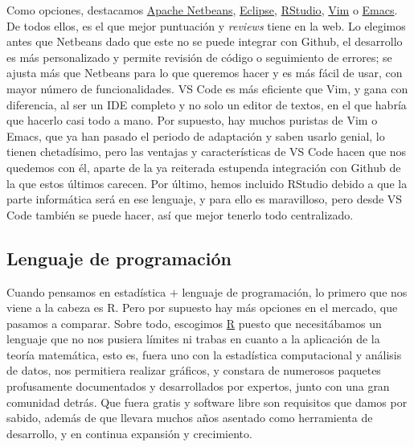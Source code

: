 Como opciones, destacamos \href{https://netbeans.apache.org/}{Apache Netbeans}, 
\href{https://www.eclipse.org/downloads/}{Eclipse}, \href{https://www.rstudio.com/}{RStudio}, \href{https://www.vim.org/}{Vim} o 
\href{https://www.gnu.org/s/emacs/}{Emacs}. De todos ellos, es el que mejor puntuación y \textit{reviews} tiene 
en la web. Lo elegimos antes que Netbeans dado que este no se puede integrar con Github, el desarrollo es más 
personalizado y permite revisión de código o seguimiento de errores; se ajusta más que Netbeans para lo que 
queremos hacer y es más fácil de usar, con mayor número de funcionalidades. VS Code es más eficiente que Vim, y 
gana con diferencia, al ser un IDE completo y no solo un editor de textos, en el que habría que hacerlo casi 
todo a mano. Por supuesto, hay muchos puristas de Vim o Emacs, que ya han pasado el periodo de adaptación y saben 
usarlo genial, lo tienen chetadísimo, pero las ventajas y características de VS Code hacen que nos quedemos 
con él, aparte de la ya reiterada estupenda integración con Github de la que estos últimos carecen. Por último, 
hemos incluido RStudio debido a que la parte informática será en ese lenguaje, y para ello es maravilloso, pero 
desde VS Code también se puede hacer, así que mejor tenerlo todo centralizado.

\subsection{Lenguaje de programación}
Cuando pensamos en estadística $+$ lenguaje de programación, lo primero que nos viene a la cabeza es R. Pero por 
supuesto hay más opciones en el mercado, que pasamos a comparar.
Sobre todo, escogimos \href{https://www.r-project.org/}{R} puesto que necesitábamos un lenguaje que no 
nos pusiera límites ni trabas en cuanto a la aplicación de la teoría matemática, esto es, fuera uno con la
estadística computacional y análisis de datos, nos permitiera realizar gráficos, y constara de numerosos 
paquetes profusamente documentados y desarrollados por expertos, junto con una gran comunidad detrás. Que 
fuera gratis y software libre son requisitos que damos por sabido, además de que llevara muchos años 
asentado como herramienta de desarrollo, y en continua expansión y crecimiento. 

